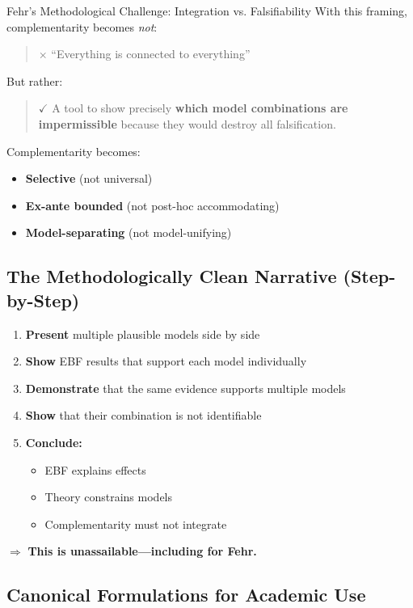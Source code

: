 \begin{chapter}{Fehr's Methodological Challenge: Integration vs. Falsifiability}
With this framing, complementarity becomes \textit{not}:

\begin{quote}
$\times$ ``Everything is connected to everything''
\end{quote}

But rather:

\begin{quote}
$\checkmark$ A tool to show precisely \textbf{which model combinations are impermissible}
because they would destroy all falsification.
\end{quote}

Complementarity becomes:
\begin{itemize}[noitemsep]
    \item \textbf{Selective} (not universal)
    \item \textbf{Ex-ante bounded} (not post-hoc accommodating)
    \item \textbf{Model-separating} (not model-unifying)
\end{itemize}

\subsection{The Methodologically Clean Narrative (Step-by-Step)}

\begin{enumerate}
    \item \textbf{Present} multiple plausible models side by side
    \item \textbf{Show} EBF results that support each model individually
    \item \textbf{Demonstrate} that the same evidence supports multiple models
    \item \textbf{Show} that their combination is not identifiable
    \item \textbf{Conclude:}
    \begin{itemize}[noitemsep]
        \item EBF explains effects
        \item Theory constrains models
        \item Complementarity must not integrate
    \end{itemize}
\end{enumerate}

$\Rightarrow$ \textbf{This is unassailable---including for Fehr.}

\subsection{Canonical Formulations for Academic Use}


\end{chapter}
